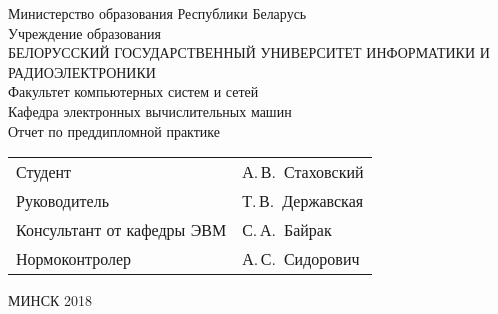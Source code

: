 \begin{titlepage}

    \begin{center}
        Министерство образования Республики Беларусь \\[1em]

        Учреждение образования \\

        \MakeUppercase{БЕЛОРУССКИЙ ГОСУДАРСТВЕННЫЙ УНИВЕРСИТЕТ ИНФОРМАТИКИ И РАДИОЭЛЕКТРОНИКИ} \\[1em]

        Факультет компьютерных систем и сетей \\[1em]

        Кафедра электронных вычислительных машин \\[5em] %

        {Отчет по преддипломной практике} \\[7em]

        \noindent

        \begin{tabular}{ p{}p{} }
            Студент & А.\,В.~Стаховский \\[1em]
            Руководитель & Т.\,В.~Державская \\[1em]
            Консультант от кафедры ЭВМ & С.\,А.~Байрак \\[1em]
            Нормоконтролер & А.\,С.~Сидорович \\[1em]
        \end{tabular}

        \vfill

        {\normalsize МИНСК 2018}
    \end{center}

\end{titlepage}
